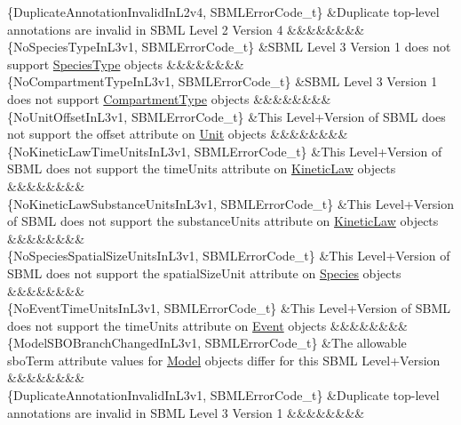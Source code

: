 \begin{DoxyParagraph}{}
\begin{longtabu}
\{Duplicate\+Annotation\+Invalid\+In\+L2v4, S\+B\+M\+L\+Error\+Code\+\_\+t\} &Duplicate top-\/level annotations are invalid in S\+B\+ML Level 2 Version 4 &&&&&&&&\\
\{No\+Species\+Type\+In\+L3v1, S\+B\+M\+L\+Error\+Code\+\_\+t\} &S\+B\+ML Level 3 Version 1 does not support \hyperlink{class_species_type}{Species\+Type} objects &&&&&&&&\\
\{No\+Compartment\+Type\+In\+L3v1, S\+B\+M\+L\+Error\+Code\+\_\+t\} &S\+B\+ML Level 3 Version 1 does not support \hyperlink{class_compartment_type}{Compartment\+Type} objects &&&&&&&&\\
\{No\+Unit\+Offset\+In\+L3v1, S\+B\+M\+L\+Error\+Code\+\_\+t\} &This Level+\+Version of S\+B\+ML does not support the \textquotesingle{}offset\textquotesingle{} attribute on \hyperlink{class_unit}{Unit} objects &&&&&&&&\\
\{No\+Kinetic\+Law\+Time\+Units\+In\+L3v1, S\+B\+M\+L\+Error\+Code\+\_\+t\} &This Level+\+Version of S\+B\+ML does not support the \textquotesingle{}time\+Units\textquotesingle{} attribute on \hyperlink{class_kinetic_law}{Kinetic\+Law} objects &&&&&&&&\\
\{No\+Kinetic\+Law\+Substance\+Units\+In\+L3v1, S\+B\+M\+L\+Error\+Code\+\_\+t\} &This Level+\+Version of S\+B\+ML does not support the \textquotesingle{}substance\+Units\textquotesingle{} attribute on \hyperlink{class_kinetic_law}{Kinetic\+Law} objects &&&&&&&&\\
\{No\+Species\+Spatial\+Size\+Units\+In\+L3v1, S\+B\+M\+L\+Error\+Code\+\_\+t\} &This Level+\+Version of S\+B\+ML does not support the \textquotesingle{}spatial\+Size\+Unit\textquotesingle{} attribute on \hyperlink{class_species}{Species} objects &&&&&&&&\\
\{No\+Event\+Time\+Units\+In\+L3v1, S\+B\+M\+L\+Error\+Code\+\_\+t\} &This Level+\+Version of S\+B\+ML does not support the \textquotesingle{}time\+Units\textquotesingle{} attribute on \hyperlink{class_event}{Event} objects &&&&&&&&\\
\{Model\+S\+B\+O\+Branch\+Changed\+In\+L3v1, S\+B\+M\+L\+Error\+Code\+\_\+t\} &The allowable \textquotesingle{}sbo\+Term\textquotesingle{} attribute values for \hyperlink{class_model}{Model} objects differ for this S\+B\+ML Level+\+Version &&&&&&&&\\
\{Duplicate\+Annotation\+Invalid\+In\+L3v1, S\+B\+M\+L\+Error\+Code\+\_\+t\} &Duplicate top-\/level annotations are invalid in S\+B\+ML Level 3 Version 1 &&&&&&&&\\

\end{longtabu}
\end{DoxyParagraph}
